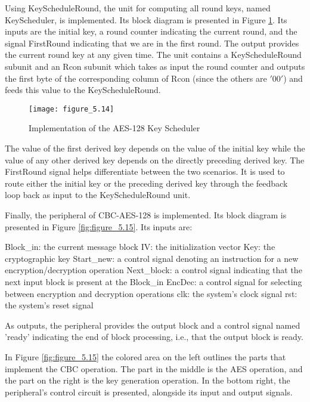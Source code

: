 Using KeyScheduleRound, the unit for computing all round keys, named KeyScheduler, is implemented. Its block diagram is presented in Figure \ref{fig:figure_5.14}. Its inputs are the initial key, a round counter indicating the current round, and the signal FirstRound indicating that we are in the first round. The output provides the current round key at any given time. The unit contains a KeyScheduleRound subunit and an Rcon subunit which takes as input the round counter and outputs the first byte of the corresponding column of Rcon (since the others are $'00'$) and feeds this value to the KeyScheduleRound.

\begin{figure}
\centering
\texttt{[image: figure\_5.14]}\\
\caption{ Implementation of the AES-128 Key Scheduler }
\label{fig:figure_5.14}
\end{figure}


The value of the first derived key depends on the value of the initial key while the value of any other derived key depends on the directly preceding derived key. The FirstRound signal helps differentiate between the two scenarios. It is used to route either the initial key or the preceding derived key through the feedback loop back as input to the KeyScheduleRound unit.

Finally, the peripheral of CBC-AES-128 is implemented. Its block diagram is presented in Figure \ref{fig:figure_5.15}. Its inputs are:
\begin{outline}
    \1 Block\_in: the current message block
    \1 IV: the initialization vector
    \1 Key: the cryptographic key
    \1 Start\_new: a control signal denoting an instruction for a new encryption/decryption operation
    \1 Next\_block: a control signal indicating that the next input block is present at the Block\_in
    \1 EncDec: a control signal for selecting between encryption and decryption operations
    \1 clk: the system's clock signal
    \1 rst: the system's reset signal
\end{outline}
As outputs, the peripheral provides the output block and a control signal named 'ready' indicating the end of block processing, i.e., that the output block is ready.

In Figure \ref{fig:figure_5.15} the colored area on the left outlines the parts that implement the CBC operation. The part in the middle is the AES operation, and the part on the right is the key generation operation. In the bottom right, the peripheral's control circuit is presented, alongside its input and output signals.

